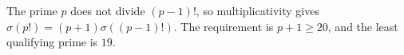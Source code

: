 The prime $p$ does not divide $(p-1)!$, so multiplicativity gives $\sigma(p!)=(p+1)\sigma((p-1)!)$. The requirement is $p+1\ge20$, and the least qualifying prime is $\boxed{19}$.
